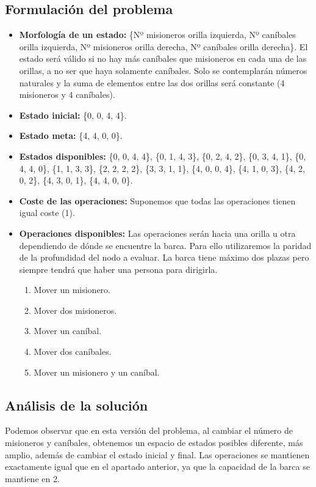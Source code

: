 \documentclass{article}
\begin{document}
\subsection{Formulación del problema}
\begin{itemize}
  \item \textbf{Morfología de un estado:} \{Nº misioneros orilla izquierda, Nº caníbales orilla izquierda, Nº misioneros orilla derecha, Nº caníbales orilla derecha\}. El estado será válido si no hay más caníbales que misioneros en cada una de las orillas, a no ser que haya solamente caníbales. Solo se contemplarán números naturales y la suma de elementos entre las dos orillas será constante (4 misioneros y 4 caníbales).
  \item \textbf{Estado inicial:} \{0, 0, 4, 4\}.
  \item \textbf{Estado meta:} \{4, 4, 0, 0\}.
  \item \textbf{Estados disponibles:} \{0, 0, 4, 4\}, \{0, 1, 4, 3\}, \{0, 2, 4, 2\}, \{0, 3, 4, 1\}, \{0, 4, 4, 0\}, \{1, 1, 3, 3\}, \{2, 2, 2, 2\}, \{3, 3, 1, 1\}, \{4, 0, 0, 4\}, \{4, 1, 0, 3\}, \{4, 2, 0, 2\}, \{4, 3, 0, 1\}, \{4, 4, 0, 0\}.
  \item \textbf{Coste de las operaciones:} Suponemos que todas las operaciones tienen igual coste (1).
  \item \textbf{Operaciones disponibles:} Las operaciones serán hacia una orilla u otra dependiendo de dónde se encuentre la barca. Para ello utilizaremos la paridad de la profundidad del nodo a evaluar. La barca tiene máximo dos plazas pero siempre tendrá que haber una persona para dirigirla.
  \begin{enumerate}
    \item Mover un misionero.
    \item Mover dos misioneros.
    \item Mover un caníbal.
    \item Mover dos caníbales.
    \item Mover un misionero y un caníbal.
  \end{enumerate}
\end{itemize}

\subsection{Análisis de la solución}
Podemos observar que en esta versión del problema, al cambiar el número de misioneros y caníbales, obtenemos un espacio de estados posibles diferente, más amplio, además de cambiar el estado inicial y final. Las operaciones se mantienen exactamente igual que en el apartado anterior, ya que la capacidad de la barca se mantiene en 2.\\
\end{document}
